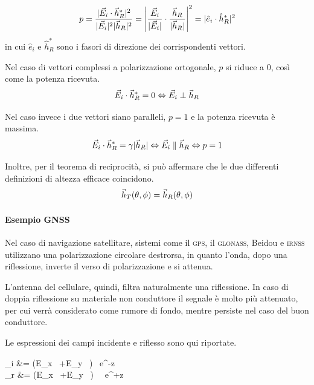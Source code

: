 \begin{equation}
	p
	=\frac{|\vec{E}_i \cdot \vec{h}_R^*|^2}{|\vec{E}_i|^2 |\vec{h}_R|^2}
	= \left|
		\frac{\vec{E}_i}{|\vec{E}_i|}\cdot\frac{\vec{h}_R}{|\vec{h}_R|}
	\right|^2
	= |\hat{e}_i \cdot \hat{h}_R^*|^2
\end{equation}
in cui $\hat{e}_i$ e $\hat{h}_R^*$ sono i fasori di direzione dei corrispondenti vettori.

Nel caso di vettori complessi a polarizzazione ortogonale, $p$ si riduce a 0, così come la potenza ricevuta.
\begin{equation}
	\vec{E}_i \cdot \vec{h}_R^* =0 \Leftrightarrow \vec{E}_i \perp \vec{h}_R
\end{equation}

Nel caso invece i due vettori siano paralleli, $p = 1$ e la potenza ricevuta è massima.
\begin{equation}
	\vec{E}_i \cdot \vec{h}_R^* = \gamma |\vec{h}_R|
	\Leftrightarrow \vec{E}_i \parallel \vec{h}_R
	\Leftrightarrow p=1
\end{equation}

\bigbreak
Inoltre, per il teorema di reciprocità, si può affermare che le due differenti definizioni di altezza efficace coincidono.
\begin{equation}
	\vec{h}_T(\theta,\phi) = \vec{h}_R(\theta,\phi)
\end{equation}

\paragraph{Esempio GNSS}
Nel caso di navigazione satellitare, sistemi come il \textsc{gps}, il \textsc{glonass}, Beidou e \textsc{irnss} utilizzano una polarizzazione circolare destrorsa, in quanto l'onda, dopo una riflessione, inverte il verso di polarizzazione e si attenua.

L'antenna del cellulare, quindi, filtra naturalmente una riflessione. In caso di doppia riflessione su materiale non conduttore il segnale è molto più attenuato, per cui verrà considerato come rumore di fondo, mentre persiste nel caso del buon conduttore.

Le espressioni dei campi incidente e riflesso sono qui riportate.
\begin{esp*}
	\E_i &= (E_x \, +E_y \, ) \, e^{\textcolor[rgb]{0.8,0,0}{-}\jmath \beta z} \\
	\E_r &= (E_x \, +E_y \, ) \, \rho \, e^{\textcolor[rgb]{0.8,0,0}{+}\jmath \beta z} \\
\end{esp*}

